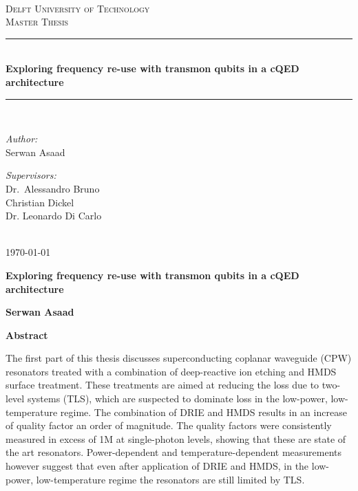 \documentclass[12pt]{report}
\newcommand\blankpage{%
    \null
    \thispagestyle{empty}%
    \addtocounter{page}{-1}%
    \newpage}
\newcommand{\HRule}[1]{\rule{\linewidth}{#1}}
\begin{document}
\begin{titlepage}
\begin{center}
~\\ [4.0 cm]
\textsc{\LARGE Delft University of Technology}
\\ [3.0 cm]
\textsc{\Large Master Thesis}
\HRule{0.5 pt} \\
\LARGE \textbf{Exploring frequency re-use with transmon qubits in a cQED architecture}
\HRule{2 pt} \\ [0.5 cm]

\noindent
\begin{minipage}{0.4\textwidth}
\begin{flushleft} \large
\emph{Author:}\\
Serwan Asaad
\end{flushleft}
\end{minipage}%
\begin{minipage}{0.4\textwidth}
\begin{flushright} \large
\emph{Supervisors:} \\
Dr.~Alessandro Bruno \\
Christian Dickel\\
Dr. Leonardo Di Carlo
\end{flushright}
\end{minipage}
\\ [3.0 cm]
{\large \today}
\end{center}

\end{titlepage}


\author{
    Serwan Asaad
    Student ID: 4323475 \\
    Delft University of Technology \\
    Kavli Institute of Nanoscience\\
    Quantum Nanoscience Department\\
    Quantum Transport Group\\
    DiCarlo Lab}

\blankpage
\thispagestyle{plain}
\begin{center}
    \Large
    \textbf{Exploring frequency re-use with transmon qubits in a cQED architecture}


    \vspace{0.4cm}
    \textbf{Serwan Asaad}

    \vspace{0.9cm}
    \textbf{Abstract}
\end{center}
The first part of this thesis discusses superconducting coplanar waveguide (CPW) resonators treated with a combination of deep-reactive ion etching and HMDS surface treatment. These treatments are aimed at reducing the loss due to two-level systems (TLS), which are suspected to dominate loss in the low-power, low-temperature regime. The combination of DRIE and HMDS results in an increase of quality factor an order of magnitude. The quality factors were consistently measured in excess of 1M at single-photon levels, showing that these are state of the art resonators. Power-dependent and temperature-dependent measurements however suggest that even after application of DRIE and HMDS, in the low-power, low-temperature regime the resonators are still limited by TLS.
\end{document}
